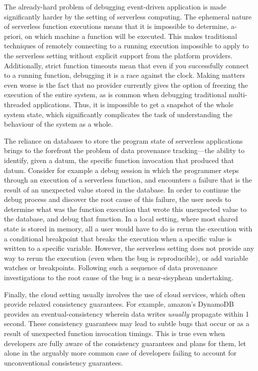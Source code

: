 The already-hard problem of debugging event-driven application is made
significantly harder by the setting of serverless computing. The ephemeral
nature of serverless function executions means that it is impossible to
determine, a-priori, on which machine a function will be executed. This makes
traditional techniques of remotely connecting to a running execution impossible
to apply to the serverless setting without explicit support from the platform
providers. Additionally, strict function timeouts mean that even if you
successfully connect to a running function, debugging it is a race against the
clock. Making matters even worse is the fact that no provider currently gives
the option of freezing the execution of the entire system, as is common when
debugging traditional multi-threaded applications. Thus, it is impossible to get
a snapshot of the whole system state, which significantly complicates the task
of understanding the behaviour of the system as a whole.

The reliance on databases to store the program state of serverless applications
brings to the forefront the problem of data provenance tracking---the ability to
identify, given a datum, the specific function invocation that produced that
datum. Consider for example a debug session in which the programmer steps
through an execution of a serverless function, and encounters a failure that is
the result of an unexpected value stored in the database. In order to continue
the debug process and discover the root cause of this failure, the user needs to
determine what was the function execution that wrote this unexpected value to
the database, and debug that function. In a local setting, where most shared
state is stored in memory, all a user would have to do is rerun the execution
with a conditional breakpoint that breaks the execution when a specific value is
written to a specific variable. However, the serverless setting does not provide
any way to rerun the execution (even when the bug is reproducible), or add
variable watches or breakpoints. Following such a sequence of data provenance
investigations to the root cause of the bug is a near-sisyphean undertaking.

Finally, the cloud setting usually involves the use of cloud services, which
often provide relaxed consistency guarantees. For example, amazon's DynamoDB
provides an eventual-consistency wherein data writes \emph{usually} propagate
within 1 second. These consistency guarantees may lead to subtle bugs that occur
or as a result of unexpected function invocation timings. This is true even when
developers are fully aware of the consistency guarantees and plans for them, let
alone in the arguably more common case of developers failing to account for
unconventional consistency guarantees. 

%
%
%
%
